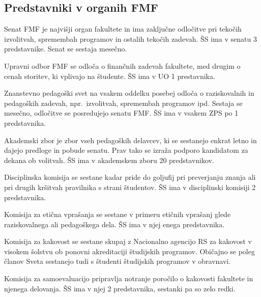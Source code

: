 \documentclass[a4paper,oneside,12pt]{article}
\theoremstyle{definition}
\newenvironment{description*}{\vspace{-6pt}\begin{description}\setlength{\itemsep}{0pt}\setlength{\parskip}{2pt}}{\end{description}\vspace{-1\parskip}}
\begin{document}
\subsection*{Predstavniki v organih FMF}
\begin{description*}
  \item[Senat FMF] je najvišji organ fakultete in ima zaključne odločitve pri tekočih izvolitvah,
    spremembah programov in ostalih tekočih zadevah. ŠS ima v senatu 3 predstavnike. Senat se
    sestaja mesečno.
  \item[Upravni odbor FMF] se odloča o finančnih zadevah fakultete, med drugim o cenah storitev, ki
    vplivajo na študente. ŠS ima v UO 1 prestavnika.
  \item[Znanstevno pedagoški svet] na vsakem oddelku posebej odloča o raziskovalnih in pedagoških
    zadevah, npr.~izvolitvah, spremembah programov ipd. Sestaja se mesečno, odločitve se posredujejo
    senatu FMF.  ŠS ima v vsakem ZPS po 1 predstavnika.
  \item[Akademski zbor] je zbor vseh pedagoških delavcev, ki se sestanejo enkrat letno in dajejo
    predloge in pobude senatu. Prav tako se izraža podporo kandidatom za dekana ob volitvah. ŠS ima
    v akademskem zboru 20 predstavnikov.
  \item[Disciplinska komisija] se sestane kadar pride do goljufij pri preverjanju znanja ali pri
    drugih kršitvah pravilnika s strani študentov. ŠS ima v disciplinski komisiji 2 predstavnika.
  \item[Komisija za etična vprašanja] se sestane v primeru etičnih vprašanj glede raziskovalnega ali
    pedagoškega dela. ŠS ima v njej enega predstavnika.
  \item[Komisija za kakovost] se sestane skupaj z Nacionalno agencijo RS za kakovost v visokem
    šolstvu ob ponovni akreditaciji študijskih programov. Običajno se poleg članov Sveta sestanejo
    tudi s študenti študijskih programov v obravnavi.
  \item[Komisija za samoevaluacijo] pripravlja notranje poročilo o kakovosti fakultete in njenega
    delovanja. ŠS ima v njej 2 predstavnika, sestanki pa so zelo redki.
\end{description*}
\end{document}
